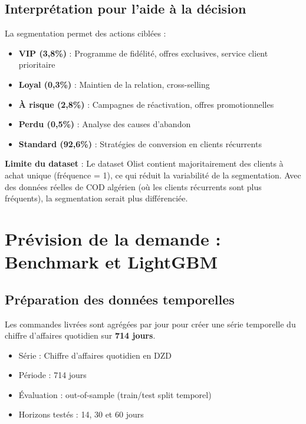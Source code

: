 \documentclass[12pt,a4paper]{report}
\begin{document}
\subsection{Interpr\'{e}tation pour l'aide \`{a} la d\'{e}cision}

La segmentation permet des actions cibl\'{e}es :

\begin{itemize}
  \item \textbf{VIP (3,8\%)} : Programme de fid\'{e}lit\'{e}, offres exclusives, service client prioritaire
  \item \textbf{Loyal (0,3\%)} : Maintien de la relation, cross-selling
  \item \textbf{\`{A} risque (2,8\%)} : Campagnes de r\'{e}activation, offres promotionnelles
  \item \textbf{Perdu (0,5\%)} : Analyse des causes d'abandon
  \item \textbf{Standard (92,6\%)} : Strat\'{e}gies de conversion en clients r\'{e}currents
\end{itemize}

\textbf{Limite du dataset} : Le dataset Olist contient majoritairement des clients \`{a} achat unique (fr\'{e}quence = 1), ce qui r\'{e}duit la variabilit\'{e} de la segmentation. Avec des donn\'{e}es r\'{e}elles de COD alg\'{e}rien (o\`{u} les clients r\'{e}currents sont plus fr\'{e}quents), la segmentation serait plus diff\'{e}renci\'{e}e.


\section{Pr\'{e}vision de la demande : Benchmark et LightGBM}

\subsection{Pr\'{e}paration des donn\'{e}es temporelles}

Les commandes livr\'{e}es sont agr\'{e}g\'{e}es par jour pour cr\'{e}er une s\'{e}rie temporelle du chiffre d'affaires quotidien sur \textbf{714 jours}.

\begin{itemize}
  \item S\'{e}rie : Chiffre d'affaires quotidien en DZD
  \item P\'{e}riode : 714 jours
  \item \'{E}valuation : out-of-sample (train/test split temporel)
  \item Horizons test\'{e}s : 14, 30 et 60 jours
\end{itemize}
\end{document}
